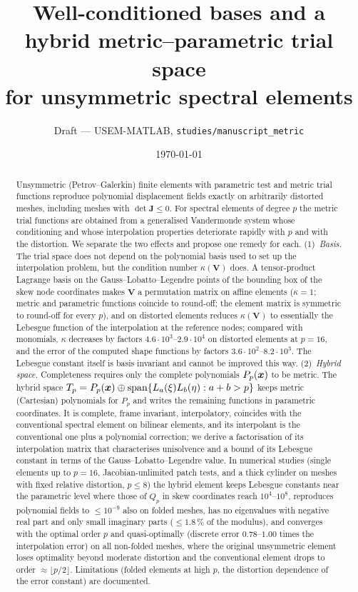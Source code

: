 \documentclass[10pt,a4paper]{article}
\title{Well-conditioned bases and a hybrid metric--parametric trial space\\
       for unsymmetric spectral elements}
\author{Draft --- USEM-MATLAB, \texttt{studies/manuscript\_metric}}
\date{\today}
\begin{document}
\maketitle

\begin{abstract}
\noindent
Unsymmetric (Petrov--Galerkin) finite elements with parametric test and metric trial
functions reproduce polynomial displacement fields exactly on arbitrarily distorted meshes,
including meshes with $\det\bm J\le0$. For spectral elements of degree $p$ the metric trial
functions are obtained from a generalised Vandermonde system whose conditioning and whose
interpolation properties deteriorate rapidly with $p$ and with the distortion. We separate
the two effects and propose one remedy for each. (1)~\emph{Basis.} The trial space does not
depend on the polynomial basis used to set up the interpolation problem, but the condition
number $\kappa(\bm V)$ does. A tensor-product Lagrange basis on the Gauss--Lobatto--Legendre
points of the bounding box of the skew node coordinates makes $\bm V$ a permutation matrix on
affine elements ($\kappa=1$; metric and parametric functions coincide to round-off; the element
matrix is symmetric to round-off for every $p$), and on distorted elements reduces $\kappa(\bm V)$
to essentially the Lebesgue function of the interpolation at the reference nodes; compared with
monomials, $\kappa$ decreases by factors $4.6\cdot10^{3}$--$2.9\cdot10^{4}$ on distorted elements at
$p=16$, and the error of the computed shape functions by factors $3.6\cdot10^2$--$8.2\cdot10^3$. The Lebesgue constant itself is
basis invariant and cannot be improved this way. (2)~\emph{Hybrid space.} Completeness requires
only the complete polynomials $P_p(\bm{x})$ to be metric. The hybrid space $T_p=P_p(\bm{x})\oplus
\operatorname{span}\{L_a(\xi)L_b(\eta):a+b>p\}$ keeps metric (Cartesian) polynomials for
$P_p$ and writes the remaining functions in parametric coordinates. It is complete, frame
invariant, interpolatory, coincides with the conventional spectral element on bilinear
elements, and its interpolant is the conventional one plus a polynomial correction; we
derive a factorisation of its interpolation matrix that characterises unisolvence and a bound
of its Lebesgue constant in terms of the Gauss--Lobatto--Legendre value. In numerical
studies (single elements up to $p=16$, Jacobian-unlimited patch tests, and a thick cylinder on
meshes with fixed relative distortion, $p\le8$) the hybrid element keeps Lebesgue constants
near the parametric level where those of $Q_p$ in skew coordinates reach $10^{4}$--$10^{8}$,
reproduces polynomial fields to $\le10^{-9}$ also on folded meshes, has no eigenvalues with
negative real part and only small imaginary parts ($\le1.8\,\%$ of the modulus), and converges with the optimal order $p$ and quasi-optimally (discrete
error $0.78$--$1.00$ times the interpolation error) on all non-folded meshes, where the original
unsymmetric element loses optimality beyond moderate distortion and the conventional element
drops to order $\approx\lfloor p/2\rfloor$. Limitations (folded elements at high $p$, the
distortion dependence of the error constant) are documented.
\end{abstract}










\end{document}
